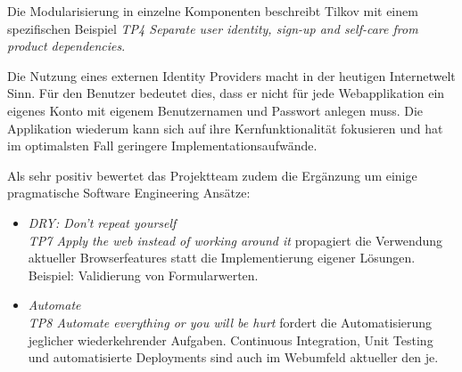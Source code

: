 Die Modularisierung in einzelne Komponenten beschreibt Tilkov mit einem spezifischen Beispiel \emph{TP4 Separate user identity, sign-up and self-care from product dependencies}.

Die Nutzung eines externen Identity Providers macht in der heutigen Internetwelt Sinn. Für den Benutzer bedeutet dies, dass er nicht für jede Webapplikation ein eigenes Konto mit eigenem Benutzernamen und Passwort anlegen muss. Die Applikation wiederum kann sich auf ihre Kernfunktionalität fokusieren und hat im optimalsten Fall geringere Implementationsaufwände.

Als sehr positiv bewertet das Projektteam zudem die Ergänzung um einige pragmatische Software Engineering Ansätze:

\begin{itemize}
	\item \emph{DRY: Don't repeat yourself}\\
	\emph{TP7 Apply the web instead of working around it} propagiert die Verwendung aktueller Browserfeatures statt die Implementierung eigener Lösungen.\\
	Beispiel: Validierung von Formularwerten.
	\item \emph{Automate}\\
	\emph{TP8 Automate everything or you will be hurt} fordert die Automatisierung jeglicher wiederkehrender Aufgaben. Continuous Integration, Unit Testing und automatisierte Deployments sind auch im Webumfeld aktueller den je.
\end{itemize}